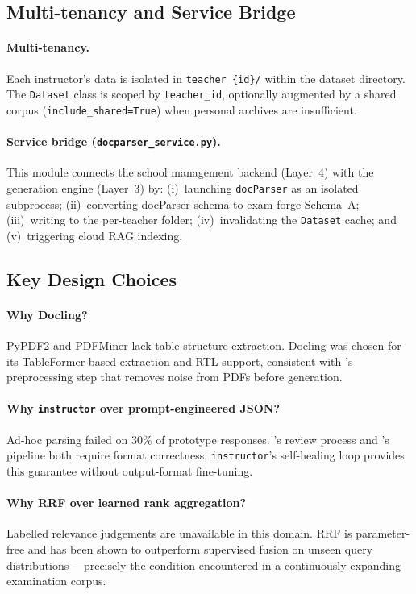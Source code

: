 \subsection{Multi-tenancy and Service Bridge}

\paragraph{Multi-tenancy.}
Each instructor's data is isolated in \texttt{teacher\_\{id\}/} within the dataset
directory. The \texttt{Dataset} class is scoped by \texttt{teacher\_id}, optionally
augmented by a shared corpus (\texttt{include\_shared=True}) when personal archives
are insufficient.

\paragraph{Service bridge (\texttt{docparser\_service.py}).}
This module connects the school management backend (Layer~4) with the generation
engine (Layer~3) by: (i)~launching \texttt{docParser} as an isolated subprocess;
(ii)~converting docParser schema to exam-forge Schema~A; (iii)~writing to the
per-teacher folder; (iv)~invalidating the \texttt{Dataset} cache; and
(v)~triggering cloud RAG indexing.

\subsection{Key Design Choices}

\paragraph{Why Docling?}
PyPDF2 and PDFMiner lack table structure extraction. Docling was chosen for its
TableFormer-based extraction and RTL support, consistent with \citet{mucciaccia2025mcq}'s
preprocessing step that removes noise from PDFs before generation.

\paragraph{Why \texttt{instructor} over prompt-engineered JSON?}
Ad-hoc parsing failed on 30\% of prototype responses.
\citet{mucciaccia2025mcq}'s review process and \citet{morris2024aqg}'s pipeline
both require format correctness; \texttt{instructor}'s self-healing loop provides
this guarantee without output-format fine-tuning.

\paragraph{Why RRF over learned rank aggregation?}
Labelled relevance judgements are unavailable in this domain. RRF is parameter-free
and has been shown to outperform supervised fusion on unseen query distributions
\cite{cormack2009rrf}---precisely the condition encountered in a continuously
expanding examination corpus.
